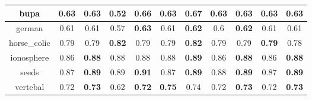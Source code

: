 \documentclass{article}%
\begin{document}
\begin{tabular}{c|cccccccccc}
\hline%
bupa&0.63&0.63&0.52&\textbf{0.66}&0.63&\textbf{0.67}&0.63&0.63&0.63&0.63\\%
\hline%
german&0.61&0.61&0.57&\textbf{0.63}&0.61&\textbf{0.62}&0.6&\textbf{0.62}&0.61&0.61\\%
\hline%
horse\_colic&0.79&0.79&\textbf{0.82}&0.79&0.79&\textbf{0.82}&0.79&0.79&\textbf{0.79}&0.78\\%
\hline%
ionosphere&0.86&\textbf{0.88}&0.88&0.88&0.88&\textbf{0.89}&0.86&\textbf{0.88}&0.86&\textbf{0.88}\\%
\hline%
seeds&0.87&\textbf{0.89}&0.89&\textbf{0.91}&0.87&\textbf{0.89}&0.88&\textbf{0.89}&0.87&\textbf{0.89}\\%
\hline%
vertebal&0.72&\textbf{0.73}&0.62&\textbf{0.72}&\textbf{0.75}&0.74&0.72&\textbf{0.73}&0.72&\textbf{0.73}\\%
\hline%
\end{tabular}

%
\end{document}
